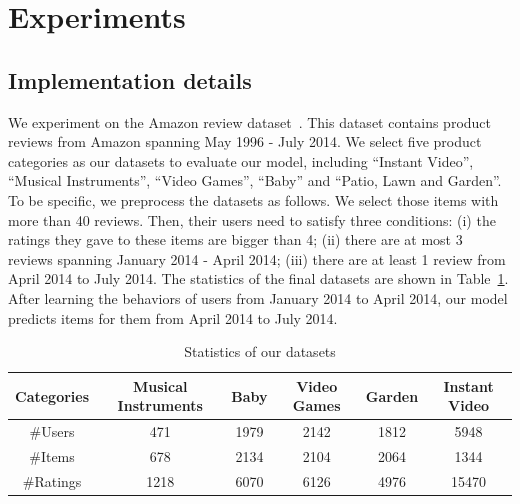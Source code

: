 \documentclass[runningheads]{llncs}
\begin{document}
\section{Experiments}
\subsection{Implementation details}
We experiment on the Amazon review dataset~\cite{mcauley2015image}. 
This dataset contains product reviews from Amazon spanning May 1996 - July 2014. 
We select five product categories as our datasets to evaluate our model, including ``Instant Video'', ``Musical Instruments'', ``Video Games'', ``Baby'' and ``Patio, Lawn and Garden''.
To be specific, we preprocess the datasets as follows.
We select those items with more than 40 reviews. Then, their users need to satisfy three conditions: (i) the ratings they gave to these items are bigger than 4; (ii) there are at most 3 reviews spanning January 2014 - April 2014; (iii) there are at least 1 review from April 2014 to July 2014.
The statistics of the final datasets are shown in Table~\ref{tab1}.
After learning the behaviors of users from January 2014 to April 2014, our model predicts items for them from April 2014 to July 2014.

\begin{table}[t]
\centering
\caption{Statistics of our datasets}
    \begin{tabular}{c|c|c|c|c|c}
    \hline
    \hline
    Categories 
    & Musical Instruments 
    & Baby
    & Video Games
    & Garden
    & Instant Video\\
    \hline
    \#Users 
    & 471
    & 1979
    & 2142
    & 1812
    & 5948\\
    \#Items 
    & 678
    & 2134
    & 2104
    & 2064
    & 1344\\
    \#Ratings 
    & 1218
    & 6070
    & 6126
    & 4976
    & 15470\\
    \hline\hline
    \end{tabular}%
\label{tab1}%
\end{table}%
\end{document}
